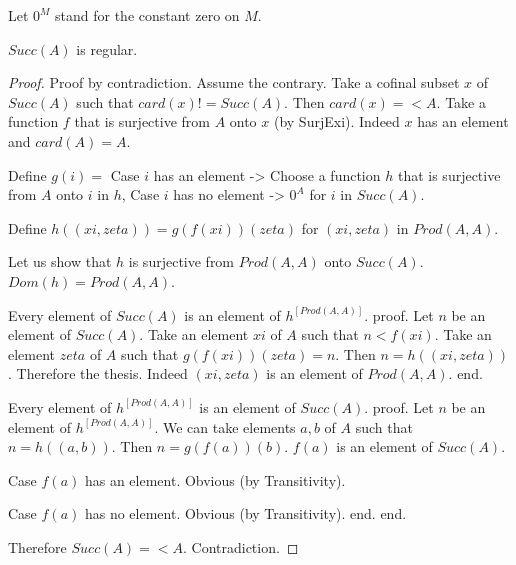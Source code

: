 \documentclass{article}
\begin{document}
\begin{forthel}
    Let $0^M$ stand for the constant zero on $M$.

    \begin{theorem}
      $Succ(A)$ is regular.
    \end{theorem}
    \begin{proof}
      Proof by contradiction. Assume the contrary. Take a cofinal subset $x$ of
      $Succ(A)$ such that $card(x) != Succ(A)$. Then $card(x) =< A$. Take a function $f$ that is surjective from $A$ onto $x$ (by SurjExi). Indeed $x$ has an element and $card(A) = A$.

      Define $g(i) =$
        Case $i$ has an element -> Choose a function $h$ that is surjective from $A$ onto $i$ in $h$,
        Case $i$ has no element -> $0^A$
      for $i$ in $Succ(A)$.

      Define $h((xi,zeta)) = g(f(xi))(zeta)$ for $(xi,zeta)$ in $Prod(A,A)$.

      Let us show that $h$ is surjective from $Prod(A,A)$ onto $Succ(A)$. $Dom(h) = Prod(A,A)$.

        Every element of $Succ(A)$ is an element of $h^[Prod(A,A)]$.
        proof.
          Let $n$ be an element of $Succ(A)$. Take an element $xi$ of $A$ such that $n < f(xi)$. Take an element $zeta$ of $A$ such that $g(f(xi))(zeta) = n$. Then $n = h((xi,zeta))$. Therefore the thesis. Indeed $(xi,zeta)$ is an element of $Prod(A,A)$.
        end.

        Every element of $h^[Prod(A,A)]$ is an element of $Succ(A)$.
        proof.
          Let $n$ be an element of $h^[Prod(A,A)]$. We can take elements $a,b$ of $A$ such that $n = h((a,b))$. Then $n = g(f(a))(b)$. $f(a)$ is an element of $Succ(A)$.

          Case $f(a)$ has an element. Obvious (by Transitivity).

          Case $f(a)$ has no element. Obvious (by Transitivity).
        end.
      end.

      Therefore $Succ(A) =< A$. Contradiction.
    \end{proof}
  \end{forthel}
\end{document}
